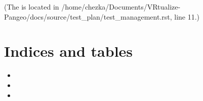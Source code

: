 \documentclass[letterpaper,10pt,english]{sphinxmanual}
\begin{document}
(The {\hyperref[\detokenize{test_plan/test_management:index-0}]{}} is located in /home/chezka/Documents/VRtualize-Pangeo/docs/source/test\_plan/test\_management.rst, line 11.)


\chapter{Indices and tables}
\label{\detokenize{index:indices-and-tables}}\begin{itemize}
\item {} 

\item {} 

\item {} 

\end{itemize}



\renewcommand{\indexname}{Index}
\printindex
\end{document}

